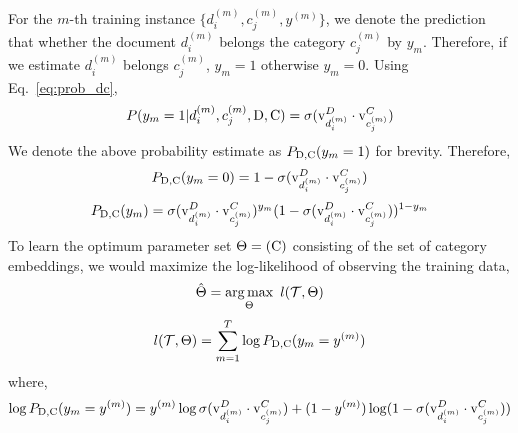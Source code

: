 For the $m$-th training instance $\{ d^{(m)}_{i}, c^{(m)}_{j}, y^{(m)}\}$, we denote the prediction that whether the document $d^{(m)}_{i}$ belongs the category $c^{(m)}_{j}$ by $y_{m}$. Therefore, if we estimate $d^{(m)}_{i}$ belongs $c^{(m)}_{j}$, $y_{m} = 1$ otherwise $y_{m} = 0$. Using Eq.~\ref{eq:prob_dc},
\begin{equation}
\label{eq:prob_trm}
P(y_{m}=1|d^{(m)}_{i}, c^{(m)}_{j}, \mathrm{D}, \mathrm{C}) = \sigma(\mathrm{v}^{D}_{d^{(m)}_{i}}\cdot \mathrm{v}^{C}_{c^{(m)}_{j}})
\end{equation}
We denote the above probability estimate as $P_{\mathrm{D}, \mathrm{C}}(y_{m} = 1)$ for brevity. Therefore,
\begin{equation}
\label{eq:prob_trm_neg}
P_{\mathrm{D}, \mathrm{C}}(y_{m} = 0) = 1 - \sigma(\mathrm{v}^{D}_{d^{(m)}_{i}}\cdot \mathrm{v}^{C}_{c^{(m)}_{j}})
\end{equation}
\begin{equation}
\label{eq:prob_bernouli}
P_{\mathrm{D}, \mathrm{C}}(y_{m}) = \sigma(\mathrm{v}^{D}_{d^{(m)}_{i}}\cdot \mathrm{v}^{C}_{c^{(m)}_{j}})^{y_{m}}(1 - \sigma(\mathrm{v}^{D}_{d^{(m)}_{i}}\cdot \mathrm{v}^{C}_{c^{(m)}_{j}}))^{1-y_{m}}
\end{equation}
To learn the optimum parameter set $\Theta = (\mathrm{C})$ consisting of the set of category embeddings, we would maximize the log-likelihood of observing the training data,
\begin{equation}
\label{eq:cembed_argmax}
\hat{\Theta} =  \operatorname*{arg\,max}_{\Theta}~l(\mathcal{T}, \Theta)
\end{equation}\begin{equation}
\label{eq:new_to_lr}
l(\mathcal{T}, \Theta) = \sum_{m=1}^{T} \log P_{\mathrm{D}, \mathrm{C}}(y_{m} = y^{(m)})
\end{equation}
where,
\begin{equation}
\label{eq:log_P_lr}
\log P_{\mathrm{D}, \mathrm{C}}(y_{m} = y^{(m)}) = y^{(m)}\log \sigma(\mathrm{v}^{D}_{d^{(m)}_{i}}\cdot \mathrm{v}^{C}_{c^{(m)}_{j}}) + (1 - y^{(m)})\log (1 - \sigma(\mathrm{v}^{D}_{d^{(m)}_{i}}\cdot \mathrm{v}^{C}_{c^{(m)}_{j}}))
\end{equation}

